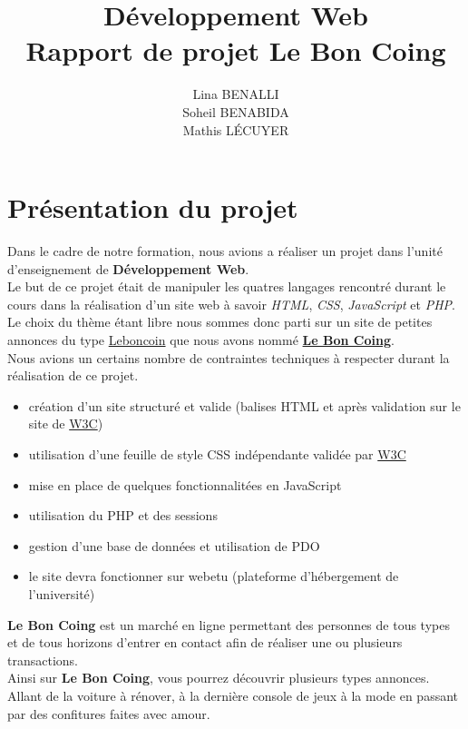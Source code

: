 \documentclass[11pt,a4paper]{article}
\title{Développement Web\\Rapport de projet \textbf{Le Bon Coing}}
\author{Lina BENALLI\\Soheil BENABIDA\\Mathis LÉCUYER}
\date{}
\begin{document}
\maketitle

\newpage

\tableofcontents

\newpage

\section{Présentation du projet}
Dans le cadre de notre formation, nous avions a réaliser un projet dans l'unité d'enseignement de \textbf{Développement Web}.\\
Le but de ce projet était de manipuler les quatres langages rencontré durant le cours dans la réalisation d'un site web à savoir \emph{HTML}, \emph{CSS}, \emph{JavaScript} et \emph{PHP}.\\
Le choix du thème étant libre nous sommes donc parti sur un site de petites annonces du type \underline{Leboncoin} que nous avons nommé \underline{\textbf{Le Bon Coing}}.\\
Nous avions un certains nombre de contraintes techniques à respecter durant la réalisation de ce projet. 
\begin{itemize}
    \item création d'un site structuré et valide (balises HTML et après validation sur le site de \href{https://validator.w3.org}{W3C})
    \item utilisation d'une feuille de style CSS indépendante validée par \href{https://jigsaw.w3.org/css-validator/}{W3C}
    \item mise en place de quelques fonctionnalitées en JavaScript
    \item utilisation du PHP et des sessions
    \item gestion d'une base de données et utilisation de PDO
    \item le site devra fonctionner sur webetu (plateforme d'hébergement de l'université)
\end{itemize}

\textbf{Le Bon Coing} est un marché en ligne permettant des personnes de tous types et de tous horizons d'entrer en contact afin de réaliser une ou plusieurs transactions.\\
Ainsi sur \textbf{Le Bon Coing}, vous pourrez découvrir plusieurs types annonces. Allant de la voiture à rénover, à la dernière console de jeux à la mode en passant par des confitures faites avec amour.\\
\end{document}
